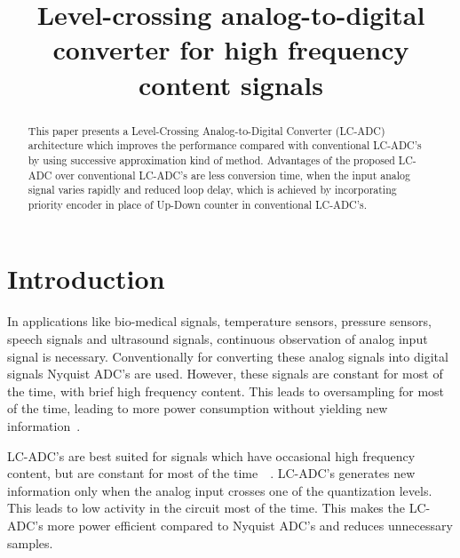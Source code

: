 \documentclass[conference]{IEEEtran}
\begin{document}
\title{Level-crossing analog-to-digital converter for high frequency content signals}
\author{
}
\maketitle
\begin{abstract}
	This paper presents a Level-Crossing Analog-to-Digital Converter (\mbox{LC-ADC}) architecture which improves the performance compared with conventional \mbox{LC-ADC's} by using successive approximation kind of method. Advantages of the proposed \mbox{LC-ADC} over conventional \mbox{LC-ADC's} are less conversion time, when the input analog signal varies rapidly and reduced loop delay, which is achieved by incorporating priority encoder in place of Up-Down counter in conventional \mbox{LC-ADC's}.   
\end{abstract}

\IEEEpeerreviewmaketitle






\section{Introduction}	
	In applications like bio-medical signals, temperature sensors, pressure sensors, speech signals and ultrasound signals, continuous observation of analog input signal is necessary. Conventionally for converting these analog signals into digital signals Nyquist \mbox{ADC's} are used. However, these signals are constant for most of the time, with brief high frequency content. This leads to oversampling for most of the time, leading to more power consumption without yielding new information~\cite{akopyan2006level}.\par

	
	\mbox{LC-ADC's} are best suited for signals which have occasional high frequency content, but are constant for most of the time~\cite{trakimas20080}~\cite{kozmin2009level}. \mbox{LC-ADC's} generates new information only when the analog input crosses one of the quantization levels. This leads to low activity in the circuit most of the time. This makes the \mbox{LC-ADC's} more power efficient compared to Nyquist ADC's and reduces unnecessary samples.\par
\end{document}
